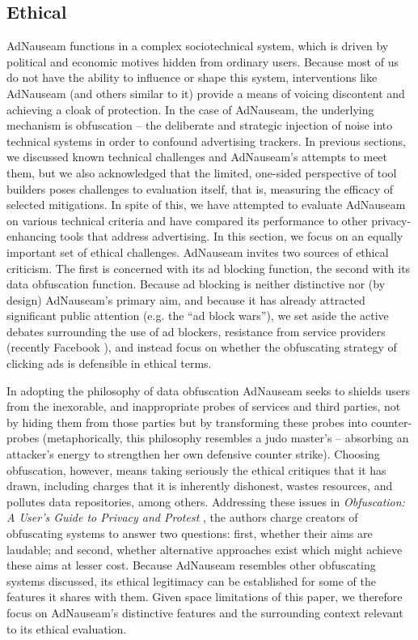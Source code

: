 \documentclass[conference]{IEEEtran}
\begin{document}
\subsection{Ethical}
AdNauseam functions in a complex sociotechnical system, which is driven by political and economic motives hidden from ordinary users. Because most of us do not have the ability to influence or shape this system, interventions like AdNauseam (and others similar to it) provide a means of voicing discontent and achieving a cloak of protection. In the case of AdNauseam, the underlying mechanism is obfuscation -- the deliberate and strategic injection of noise into technical systems in order to confound advertising trackers. In previous sections, we discussed known technical challenges and AdNauseam's attempts to meet them, but we also acknowledged that the limited, one-sided perspective of tool builders poses challenges to evaluation itself, that is, measuring the efficacy of selected mitigations. In spite of this, we have attempted to evaluate AdNauseam on various technical criteria and have compared its performance to other privacy-enhancing tools that address advertising. In this section, we focus on an equally important set of ethical challenges. AdNauseam invites two sources of ethical criticism. The first is concerned with its ad blocking function, the second with its data obfuscation function. Because ad blocking is neither distinctive nor (by design) AdNauseam's primary aim, and because it has already attracted significant public attention (e.g. the ``ad block wars''), we set aside the active debates surrounding the use of ad blockers, resistance from service providers (recently Facebook \cite{Johnston}), and instead focus on whether the obfuscating strategy of clicking ads is defensible in ethical terms.

In adopting the philosophy of data obfuscation AdNauseam seeks to shields users from the inexorable, and inappropriate probes of services and third parties, not by hiding them from those parties but by transforming these probes into counter-probes (metaphorically, this philosophy resembles a judo master's -- absorbing an attacker's energy to strengthen her own defensive counter strike). Choosing obfuscation, however, means taking seriously the ethical critiques that it has drawn, including charges that it is inherently dishonest, wastes resources, and pollutes data repositories, among others. Addressing these issues in \emph{Obfuscation: A User's Guide to Privacy and Protest} \cite{Brunton}, the authors charge creators of obfuscating systems to answer two questions: first, whether their aims are laudable; and second, whether alternative approaches exist which might achieve these aims at lesser cost. Because AdNauseam resembles other obfuscating systems discussed, its ethical legitimacy can be established for some of the features it shares with them. Given space limitations of this paper, we therefore focus on AdNauseam's distinctive features and the surrounding context relevant to its ethical evaluation.
\end{document}
